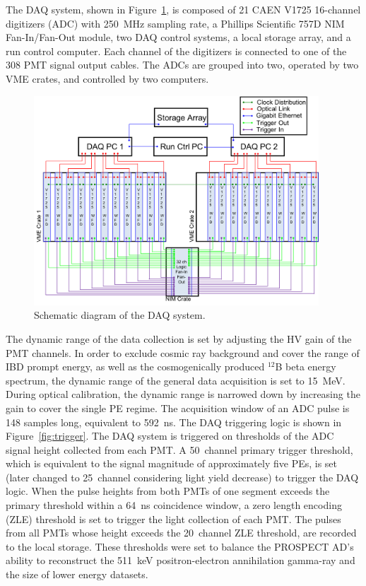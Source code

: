 
The DAQ system, shown in Figure~\ref{fig:DAQ}, is composed of 21 CAEN V1725 16-channel digitizers (ADC) with 250~MHz sampling rate, a Phillips Scientific 757D NIM Fan-In/Fan-Out module, two DAQ control systems, a local storage array, and a run control computer.
Each channel of the digitizers is connected to one of the 308 PMT signal output cables.
The ADCs are grouped into two, operated by two VME crates, and controlled by two computers.

\begin{figure}[h!]
\centering
\includegraphics[width=0.95\textwidth]{Figures/DAQ.png}\quad
\caption[DAQ system connection]{
Schematic diagram of the DAQ system.}
\label{fig:DAQ}
\end{figure}

The dynamic range of the data collection is set by adjusting the HV gain of the PMT channels.
In order to exclude cosmic ray background and cover the range of IBD prompt energy, as well as the cosmogenically produced $^{12}$B beta energy spectrum, the dynamic range of the general data acquisition is set to 15~MeV.
During optical calibration, the dynamic range is narrowed down by increasing the gain to cover the single PE regime.
The acquisition window of an ADC pulse is 148 samples long, equivalent to 592~ns. 
The DAQ triggering logic is shown in Figure~\ref{fig:trigger}.
The DAQ system is triggered on thresholds of the ADC signal height collected from each PMT.
A 50~channel primary trigger threshold, which is equivalent to the signal magnitude of approximately five PEs, is set (later changed to 25~channel considering light yield decrease) to trigger the DAQ logic. 
When the pulse heights from both PMTs of one segment exceeds the primary threshold within a 64~ns coincidence window, a zero length encoding (ZLE) threshold is set to trigger the light collection of each PMT.
The pulses from all PMTs whose height exceeds the 20~channel ZLE threshold, are recorded to the local storage.
These thresholds were set to balance the PROSPECT AD's ability to reconstruct the 511~keV positron-electron annihilation gamma-ray and the size of lower energy datasets.

